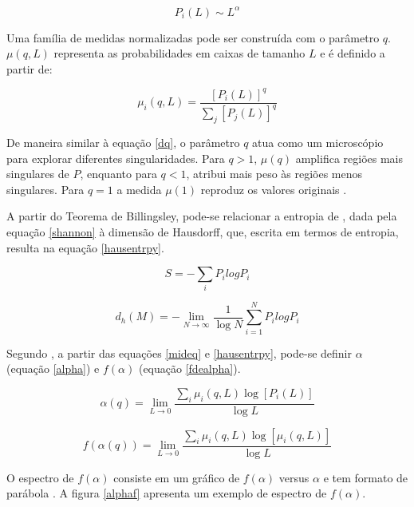 \documentclass{ufscThesis}
\begin{document}
\begin{equation}
P_{i}(L) \sim L^{\alpha}
\label{holder}
\end{equation}

Uma família de medidas normalizadas pode ser construída com o parâmetro $q$. $\mu(q,L)$ representa as probabilidades em caixas de tamanho $L$ e é definido a partir de:

\begin{equation}
\mu_{i}(q,L) = \frac{[P_{i}(L)]^{q}}{\sum_{j}[P_{j}(L)]^{q}}
\label{mideq}
\end{equation}

De maneira similar à equação \ref{dq}, o parâmetro $q$ atua como um microscópio para explorar diferentes singularidades. Para $q>1$, $\mu(q)$ amplifica regiões mais singulares de $P$, enquanto para $q<1$, atribui mais peso às regiões menos singulares. Para $q=1$ a medida $\mu(1)$ reproduz os valores originais \cite{Chhabra1989}. \par
A partir do Teorema de Billingsley, pode-se relacionar a entropia de , dada pela equação \ref{shannon} à dimensão de Hausdorff, que, escrita em termos de entropia, resulta na equação \ref{hausentrpy}.

\begin{equation}
S = - \sum_{i} P_{i}log P_{i}
\label{shannon}
\end{equation}

\begin{equation}
d_{h}(M) = - \lim_{N\rightarrow\infty} \frac{1}{\log N} \sum_{i=1}^{N} P_{i}log P_{i}
\label{hausentrpy}
\end{equation}

Segundo , a partir das equações \ref{mideq} e \ref{hausentrpy}, pode-se definir $\alpha$ (equação \ref{alpha}) e $f(\alpha)$ (equação \ref{fdealpha}). 

\begin{equation}
\alpha(q) = \lim_{L\rightarrow 0} \frac{\sum_{i} \mu_{i} (q,L) \log {[P_{i}(L)]}}{\log L}
\label{alpha}
\end{equation}

\begin{equation}
f(\alpha(q)) = \lim_{L\rightarrow 0} \frac{\sum_{i} \mu_{i} (q,L) \log {[\mu_{i}(q,L)]}}{\log L }
\label{fdealpha}
\end{equation}

O espectro de $f(\alpha)$ consiste em um gráfico de $f(\alpha)$ versus $\alpha$ e tem formato de parábola \cite{feder1988fractals}. A figura \ref{alphaf} apresenta um exemplo de espectro de $f(\alpha)$.
\end{document}
